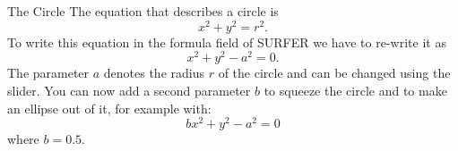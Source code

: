 \begin{surferPage}{The Circle}
The equation that describes a circle is
\[x^2+y^2=r^2.\]
To write this equation in the formula field of SURFER we have to re-write it as
\[x^2+y^2-a^2=0.\]
The parameter $a$ denotes the radius $r$ of the circle and can be changed using the slider. You can now add a second parameter $b$ to squeeze the circle and to make an ellipse out of it, for example with:
\[bx^2+y^2-a^2=0\] where $b=0.5$.
\end{surferPage}
